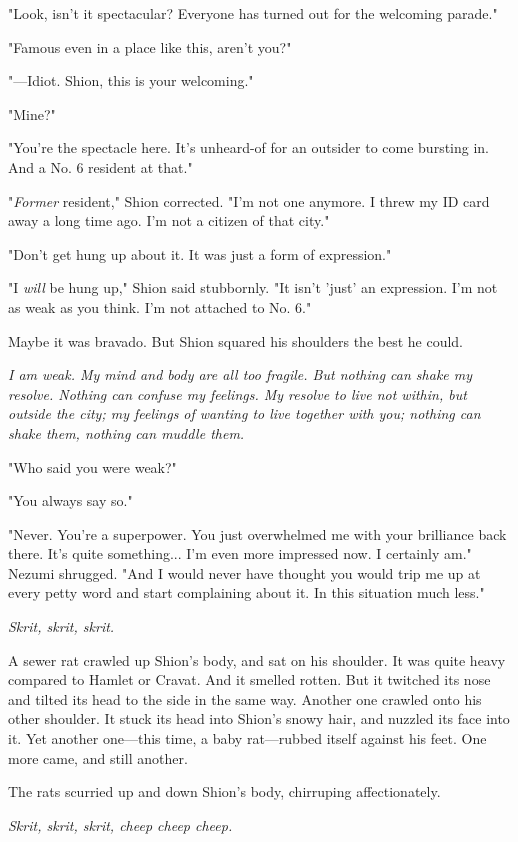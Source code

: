 "Look, isn't it spectacular? Everyone has turned out for the welcoming
parade."

"Famous even in a place like this, aren't you?"

"---Idiot. Shion, this is your welcoming."

"Mine?"

"You're the spectacle here. It's unheard-of for an outsider to come
bursting in. And a No. 6 resident at that."

"\emph{Former} resident," Shion corrected. "I'm not one anymore. I threw my ID
card away a long time ago. I'm not a citizen of that city."

"Don't get hung up about it. It was just a form of expression."

"I \emph{will} be hung up," Shion said stubbornly. "It isn't 'just' an
expression. I'm not as weak as you think. I'm not attached to No. 6."

Maybe it was bravado. But Shion squared his shoulders the best he could.

\emph{I am weak. My mind and body are all too fragile. But nothing can shake
my resolve. Nothing can confuse my feelings. My resolve to live not
within, but outside the city; my feelings of wanting to live together
with you; nothing can shake them, nothing can muddle them.}

"Who said you were weak?"

"You always say so."

"Never. You're a superpower. You just overwhelmed me with your
brilliance back there. It's quite something... I'm even more impressed
now. I certainly am." Nezumi shrugged. "And I would never have thought
you would trip me up at every petty word and start complaining about it.
In this situation much less."

\emph{Skrit, skrit, skrit.}

A sewer rat crawled up Shion's body, and sat on his shoulder. It was
quite heavy compared to Hamlet or Cravat. And it smelled rotten. But it
twitched its nose and tilted its head to the side in the same way.
Another one crawled onto his other shoulder. It stuck its head into
Shion's snowy hair, and nuzzled its face into it. Yet another one---this
time, a baby rat---rubbed itself against his feet. One more came, and
still another.

The rats scurried up and down Shion's body, chirruping affectionately.

\emph{Skrit, skrit, skrit, cheep cheep cheep.}


